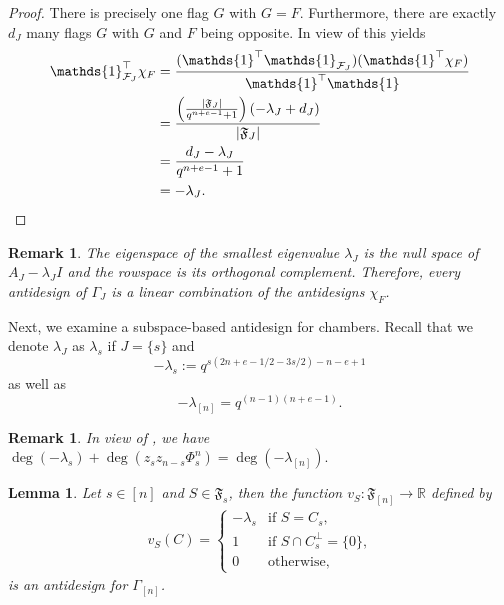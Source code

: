 \documentclass[11pt]{article}
\newtheorem{lemma}[thm]{Lemma}
\newtheorem{remark}[thm]{Remark}
\newcommand{\allones}{\mathds{1}}
\newcommand{\EKR}{\mathcal{F}}
\newcommand{\cF}{\mathfrak{F}}
\begin{document}
\begin{proof}
    There is precisely one flag $G$ with $G=F$. Furthermore, there are exactly $d_J$ many flags $G$ with $G$ and $F$ being opposite. In view of  this yields
\begin{align*}
\begin{split}
\allones_{\EKR_J}^\top \chi_F &=\frac{(\allones^\top \allones_{\EKR_J})(\allones^\top \chi_F)}{\allones^\top \allones}\\
&= \frac{\left(\frac{|\cF_J|}{q^{n+e-1}+1}\right) \left( -\lambda_J +d_J \right)}{|\cF_J|} \\
&= \frac{d_J-\lambda_J}{q^{n+e-1}+1} \\
&=-\lambda_J.
\qedhere
\end{split}
\end{align*}
\end{proof}


\begin{remark}
The eigenspace of the smallest eigenvalue $\lambda_J$ is the null space of $A_J-\lambda_JI$ and the rowspace is its orthogonal complement. Therefore, every antidesign of $\Gamma_J$ is a linear combination of the antidesigns $\chi_F$.
\end{remark}

Next, we examine a subspace-based antidesign for chambers. Recall that we denote $\lambda_J$ as $\lambda_s$ if $J=\{s\}$ and 
$$ -\lambda_s:= q^{s(2n+e-1/2-3s/2)-n-e+1}$$
as well as 
$$-\lambda_{[n]}=q^{(n-1)(n+e-1)}.$$

\begin{remark} \label{R: degree eqn}
In view of , we have
    $\deg(-\lambda_s)+\deg(z_sz_{n-s}\Phi_s^n)=\deg(-\lambda_{[n]}).$
\end{remark}

\begin{lemma} \label{N: SubspaceAntidesignChambers}
Let $s \in [n]$ and $S \in \cF_s$, then the function $v_S:\cF_{[n]}\to \mathbb{R}$ defined by
\begin{align*}
v_S(C)=\begin{cases}
-\lambda_s & \text{if $S=C_s$,}
\\
1 &  \text{if $S\cap C_{s}^\perp=\{0\}$,}
\\0 & \text{otherwise,}
\end{cases}
\end{align*}
is an antidesign for $\Gamma_{[n]}$. 
\end{lemma}
\end{document}
